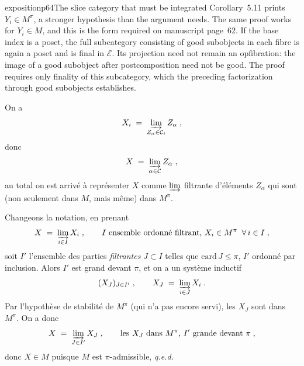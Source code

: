 \begin{dcomment}{exposition}{p64}{The slice category that must be integrated}
Corollary~5.11 prints $Y_i\in M^\pi$, a stronger hypothesis than the argument needs. The same proof works for $Y_i\in M$, and this is the form required on manuscript page~62. If the base index is a poset, the full subcategory consisting of good subobjects in each fibre is again a poset and is final in $\mathcal E$. Its projection need not remain an opfibration: the image of a good subobject after postcomposition need not be good. The proof requires only finality of this subcategory, which the preceding factorization through good subobjects establishes.
\end{dcomment}


On a
\[
X_i \;=\; \varinjlim_{Z_\alpha \in \mathcal{C}_i} Z_\alpha \;,
\]
donc
\[
X \;=\; \varinjlim_{\alpha \in \mathcal{C}} Z_\alpha \;,
\]
au total on est arrivé à représenter $X$ comme $\varinjlim$ filtrante d'éléments $Z_\alpha$ qui sont (non seulement dans $M$, mais même) dans $M^\pi$.

Changeons la notation, en prenant
\[
X \;=\; \varinjlim_{i \in I} X_i \;, \qquad I \text{ ensemble ordonné filtrant, } X_i \in M^\pi \;\; \forall\, i \in I \;,
\]
soit $I'$ l'ensemble des parties \textit{filtrantes} $J \subset I$ telles que $\mathrm{card}\, J \leq \pi$, $I'$ ordonné par inclusion. Alors $I'$ est grand devant $\pi$, et on a un système inductif
\[
(X_J)_{J \in I'} \;, \qquad X_J \;=\; \varinjlim_{i \in J} X_i \;.
\]
Par l'hypothèse de stabilité de $M^\pi$ (qui n'a pas encore servi), les $X_J$ sont dans $M^\pi$. On a donc
\[
X \;=\; \varinjlim_{J \in I'} X_J \;, \qquad \text{les } X_J \text{ dans } M^\pi\text{, } I' \text{ grande devant } \pi \;,
\]
donc $X \in M$ puisque $M$ est $\pi$-admissible, \quad \textit{q.e.d.}


